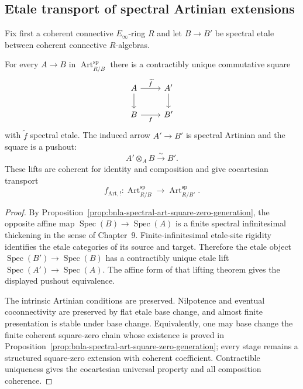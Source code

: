 \subsection{Etale transport of spectral Artinian extensions}

Fix first a coherent connective $E_\infty$-ring $R$ and let
$B\to B'$ be spectral etale between coherent connective $R$-algebras.

\begin{theorem}
\label{thm:bnla-spectral-art-etale-lift}
For every $A\to B$ in $\operatorname{Art}^{\mathrm{sp}}_{R/B}$ there is a
contractibly unique commutative square
\[
\begin{tikzcd}
A \arrow[r,"\widetilde f"] \arrow[d] & A' \arrow[d]\\
B \arrow[r,"f"'] & B'
\end{tikzcd}
\]
with $\widetilde f$ spectral etale.  The induced arrow $A'\to B'$ is spectral
Artinian and the square is a pushout:
\[
\boxed{
    A'\otimes_A B\xrightarrow{\sim}B'.}
\]
These lifts are coherent for identity and composition and give cocartesian
transport
\[
    f_{\mathrm{Art},!}:
    \operatorname{Art}^{\mathrm{sp}}_{R/B}
    \longrightarrow
    \operatorname{Art}^{\mathrm{sp}}_{R/B'}.
\]
\end{theorem}

\begin{proof}
By Proposition~\ref{prop:bnla-spectral-art-square-zero-generation}, the
opposite affine map
$\operatorname{Spec}(B)\to\operatorname{Spec}(A)$ is a finite spectral
infinitesimal thickening in the sense of Chapter~9.  Finite-infinitesimal
etale-site rigidity identifies the etale categories of its source and target.
Therefore the etale object
$\operatorname{Spec}(B')\to\operatorname{Spec}(B)$ has a contractibly unique
etale lift
$\operatorname{Spec}(A')\to\operatorname{Spec}(A)$.  The affine form of that
lifting theorem gives the displayed pushout equivalence.

The intrinsic Artinian conditions are preserved.  Nilpotence and eventual
coconnectivity are preserved by flat etale base change, and almost finite
presentation is stable under base change.  Equivalently, one may base change
the finite coherent square-zero chain whose existence is proved in
Proposition~\ref{prop:bnla-spectral-art-square-zero-generation}; every stage
remains a structured square-zero extension with coherent coefficient.
Contractible uniqueness gives the cocartesian universal property and all
composition coherence.
\end{proof}

